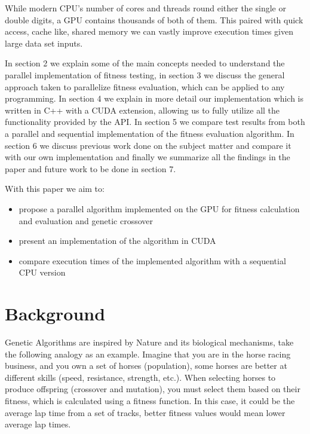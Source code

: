 \documentclass[runningheads]{llncs}
\begin{document}
While modern CPU's number of cores and threads round either the single or double digits, a GPU contains thousands of both of them. This paired with quick access, cache like, shared memory we can vastly improve execution times given large data set inputs.

In section 2 we explain some of the main concepts needed to understand the parallel implementation of fitness testing, in section 3 we discuss the general approach taken to parallelize fitness evaluation, which can be applied to any programming. In section 4 we explain in more detail our implementation which is written in C++ with a CUDA extension, allowing us to fully utilize all the functionality provided by the API. In section 5 we compare test results from both a parallel and sequential implementation of the fitness evaluation algorithm. In section 6 we discuss previous work done on the subject matter and compare it with our own implementation and finally we summarize all the findings in the paper and future work to be done in section 7.

With this paper we aim to:
\begin{itemize}
	\item propose a parallel algorithm implemented on the GPU for fitness calculation and evaluation and genetic crossover
	\item present an implementation of the algorithm in CUDA
	\item compare execution times of the implemented algorithm with a sequential CPU version
\end{itemize}


\section{Background}

Genetic Algorithms are inspired by Nature and its biological mechanisms, take the following analogy as an example. Imagine that you are in the horse racing business, and you own a set of horses (population), some horses are better at different skills (speed, resistance, strength, etc.). When selecting horses to produce offspring (crossover and mutation), you must select them based on their fitness, which is calculated using a fitness function. In this case, it could be the average lap time from a set of tracks, better fitness values would mean lower average lap times.
\end{document}
